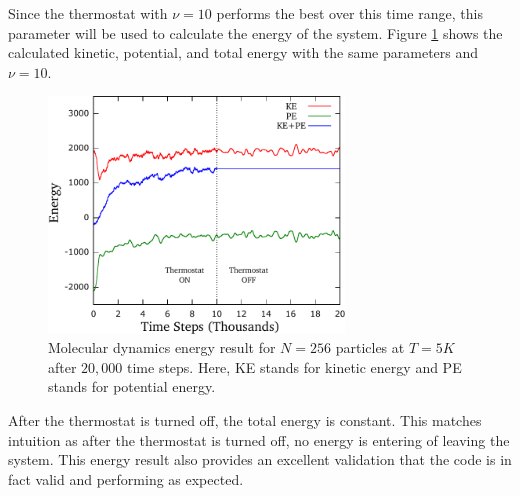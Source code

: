 \documentclass[12pt,oneside,a4paper]{article}
\begin{document}
Since the thermostat with $\nu=10$ performs the best over this time range, this parameter will be used to calculate the energy of the system.  Figure \ref{fig:energy} shows the calculated kinetic, potential, and total energy with the same parameters and $\nu=10$.  
\begin{figure}[!h]
	\centering
	\includegraphics[width=0.7\textwidth]{../cpp/results/Energy.pdf}
	\caption{Molecular dynamics energy result for $N=256$ particles at $T = 5 K$ after $20,000$ time steps.  Here, KE stands for kinetic energy and PE stands for potential energy.}
	\label{fig:energy}
\end{figure} 
After the thermostat is turned off, the total energy is constant.  This matches intuition as after the thermostat is turned off, no energy is entering of leaving the system.  This energy result also provides an excellent validation that the code is in fact valid and performing as expected.
\end{document}
